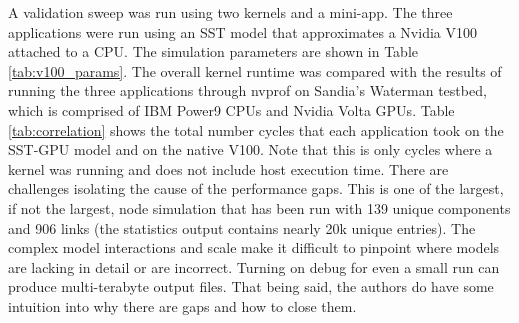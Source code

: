 A validation sweep was run using two kernels and a mini-app. The three
applications were run using an SST model that approximates a Nvidia V100
attached to a CPU. The simulation parameters are shown in Table
\ref{tab:v100_params}. The overall kernel runtime was compared with the results
of running the three applications through nvprof on Sandia's Waterman testbed,
which is comprised of IBM Power9 CPUs and Nvidia Volta GPUs. Table \ref{tab:correlation}
shows the total number cycles that each application took on the SST-GPU model
and on the native V100. Note that this is only cycles where a kernel was running
and does not include host execution time. There are challenges isolating the
cause of the performance gaps. This is one of the largest, if not the largest,
node simulation that has been run with 139 unique components and 906 links (the
statistics output contains nearly 20k unique entries). The complex model
interactions and scale make it difficult to pinpoint where models are lacking in
detail or are incorrect. Turning on debug for even a small run can produce
multi-terabyte output files. That being said, the authors do have some intuition
into why there are gaps and how to close them.


